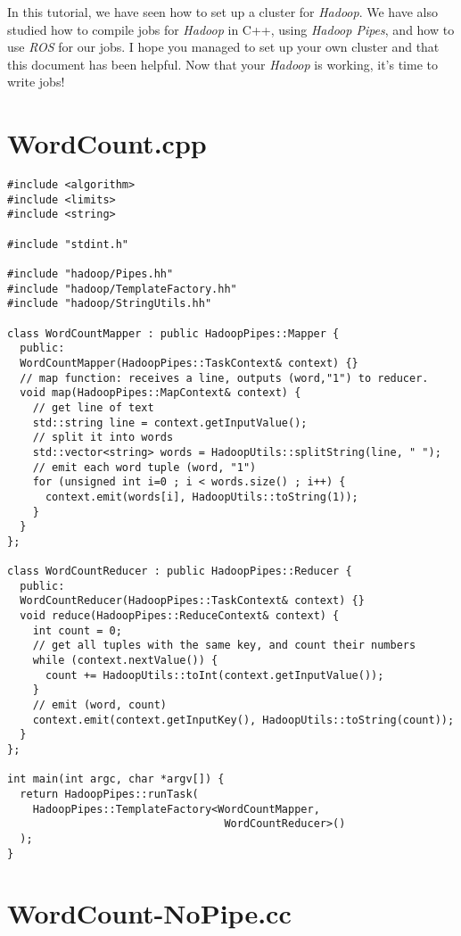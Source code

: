 \documentclass[a4paper, 12pt]{article}
\begin{document}
In this tutorial, we have seen how to set up a cluster for \textit{Hadoop}. We have also studied how to compile jobs for \textit{Hadoop} in C++, using \textit{Hadoop Pipes}, and how to use \textit{ROS} for our jobs. I hope you managed to set up your own cluster and that this document has been helpful. Now that your \textit{Hadoop} is working, it's time to write jobs!

\newpage
\begin{appendices}

  \section{WordCount.cpp}
  \label{wordcount} 

\begin{lstlisting}[style=cpp]
#include <algorithm>
#include <limits>
#include <string>

#include "stdint.h"

#include "hadoop/Pipes.hh"
#include "hadoop/TemplateFactory.hh"
#include "hadoop/StringUtils.hh"

class WordCountMapper : public HadoopPipes::Mapper {
  public:
  WordCountMapper(HadoopPipes::TaskContext& context) {}
  // map function: receives a line, outputs (word,"1") to reducer.
  void map(HadoopPipes::MapContext& context) {
    // get line of text
    std::string line = context.getInputValue();
    // split it into words
    std::vector<string> words = HadoopUtils::splitString(line, " ");
    // emit each word tuple (word, "1")
    for (unsigned int i=0 ; i < words.size() ; i++) {
      context.emit(words[i], HadoopUtils::toString(1));
    }
  }
};

class WordCountReducer : public HadoopPipes::Reducer {
  public:
  WordCountReducer(HadoopPipes::TaskContext& context) {}
  void reduce(HadoopPipes::ReduceContext& context) {
    int count = 0;
    // get all tuples with the same key, and count their numbers
    while (context.nextValue()) {
      count += HadoopUtils::toInt(context.getInputValue());
    }
    // emit (word, count)
    context.emit(context.getInputKey(), HadoopUtils::toString(count));
  }
};

int main(int argc, char *argv[]) {
  return HadoopPipes::runTask(
    HadoopPipes::TemplateFactory<WordCountMapper,
                                  WordCountReducer>()
  );
} 
\end{lstlisting}

  \newpage
  \section{WordCount-NoPipe.cc}
  \label{wordcountnopipe}


\end{appendices}
\end{document}

